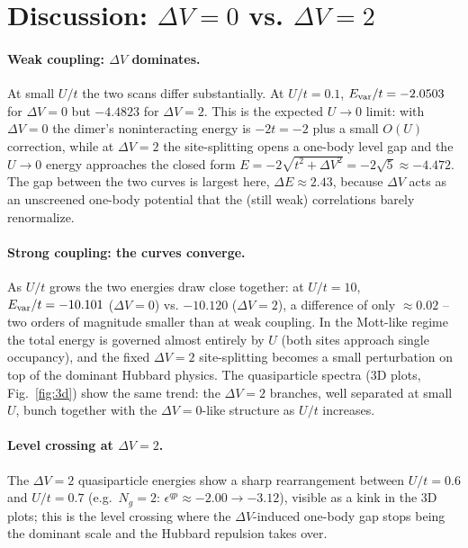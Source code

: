 \documentclass[11pt]{article}
\newcommand{\Ng}{N_{g}}
\newcommand{\dV}{\Delta V}
\begin{document}
\section{Discussion: \texorpdfstring{$\dV=0$}{dV=0} vs. \texorpdfstring{$\dV=2$}{dV=2}}
\label{sec:discussion}

\paragraph{Weak coupling: $\dV$ dominates.}
At small $U/t$ the two scans differ substantially. At $U/t=0.1$,
$E_{\rm var}/t = -2.0503$ for $\dV=0$ but $-4.4823$ for $\dV=2$.
This is the expected $U\to0$ limit: with $\dV=0$ the dimer's noninteracting
energy is $-2t=-2$ plus a small $O(U)$ correction, while at $\dV=2$ the
site-splitting opens a one-body level gap and the $U\to0$ energy approaches
the closed form $E=-2\sqrt{t^2+\dV^2}=-2\sqrt{5}\approx-4.472$. The gap between the two curves is
largest here, $\Delta E \approx 2.43$, because $\dV$ acts as an unscreened
one-body potential that the (still weak) correlations barely renormalize.

\paragraph{Strong coupling: the curves converge.}
As $U/t$ grows the two energies draw close together: at $U/t=10$,
$E_{\rm var}/t = -10.101$ ($\dV=0$) vs. $-10.120$ ($\dV=2$), a difference of
only $\approx 0.02$ -- two orders of magnitude smaller than at weak coupling.
In the Mott-like regime the total energy is governed almost entirely by $U$
(both sites approach single occupancy), and the fixed $\dV=2$ site-splitting
becomes a small perturbation on top of the dominant Hubbard physics. The
quasiparticle spectra (3D plots, Fig.~\ref{fig:3d}) show
the same trend: the $\dV=2$ branches, well separated at small $U$, bunch
together with the $\dV=0$-like structure as $U/t$ increases.

\paragraph{Level crossing at $\dV=2$.}
The $\dV=2$ quasiparticle energies show a sharp rearrangement between
$U/t=0.6$ and $U/t=0.7$ (e.g.\ $\Ng=2$: $\epsilon^{qp}\approx-2.00\to-3.12$),
visible as a kink in the 3D plots; this is the level crossing where the
$\dV$-induced one-body gap stops being the dominant scale and the Hubbard
repulsion takes over.
\end{document}
